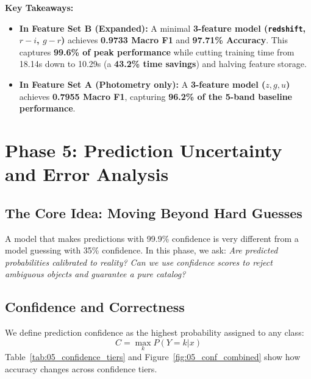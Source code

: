 \documentclass[11pt,a4paper]{article}
\begin{document}
\textbf{Key Takeaways:}
\begin{itemize}[noitemsep]
    \item \textbf{In Feature Set B (Expanded):} A minimal \textbf{3-feature model (\texttt{redshift}, $r-i$, $g-r$)} achieves \textbf{0.9733 Macro F1} and \textbf{97.71\% Accuracy}. This captures \textbf{99.6\% of peak performance} while cutting training time from 18.14s down to 10.29s (a \textbf{43.2\% time savings}) and halving feature storage.
    \item \textbf{In Feature Set A (Photometry only):} A \textbf{3-feature model ($z, g, u$)} achieves \textbf{0.7955 Macro F1}, capturing \textbf{96.2\% of the 5-band baseline performance}.
\end{itemize}

\section{Phase 5: Prediction Uncertainty and Error Analysis}

\subsection{The Core Idea: Moving Beyond Hard Guesses}
A model that makes predictions with 99.9\% confidence is very different from a model guessing with 35\% confidence. In this phase, we ask: \emph{Are predicted probabilities calibrated to reality? Can we use confidence scores to reject ambiguous objects and guarantee a pure catalog?}

\subsection{Confidence and Correctness}
We define prediction confidence as the highest probability assigned to any class:
\begin{equation}
    C = \max_{k} P(Y=k|x)
\end{equation}
Table~\ref{tab:05_confidence_tiers} and Figure~\ref{fig:05_conf_combined} show how accuracy changes across confidence tiers.
\end{document}
